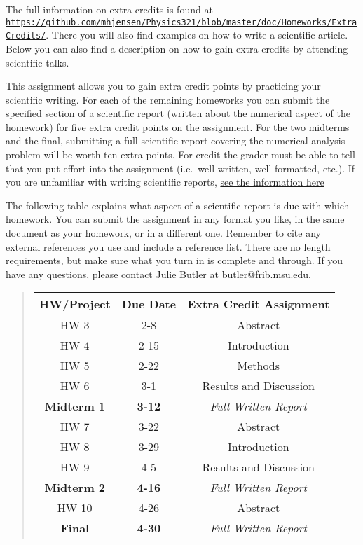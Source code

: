 \documentclass[%
oneside,                 %
final,                   %
10pt]{article}
\begin{document}
The full information on extra credits is found at \href{{https://github.com/mhjensen/Physics321/blob/master/doc/Homeworks/ExtraCredits/}}{\nolinkurl{https://github.com/mhjensen/Physics321/blob/master/doc/Homeworks/ExtraCredits/}}. There you will also find examples on how to write a scientific article. 
Below you can also find a description on how to gain extra credits by attending scientific talks.

This assignment allows you to gain extra credit points by practicing
your scientific writing.  For each of the remaining homeworks you can
submit the specified section of a scientific report (written about the
numerical aspect of the homework) for five extra credit points on the
assignment.  For the two midterms and the final, submitting a full
scientific report covering the numerical analysis problem will be
worth ten extra points.  For credit the grader must be able to tell
that you put effort into the assignment (i.e.~well written, well
formatted, etc.).  If you are unfamiliar with writing scientific
reports, \href{{https://github.com/mhjensen/Physics321/blob/master/doc/Homeworks/ExtraCredits/IntroductionScientificWriting.md}}{see the information here}

The following table explains what aspect of a scientific report is due
with which homework.  You can submit the assignment in any format you
like, in the same document as your homework, or in a different one.
Remember to cite any external references you use and include a
reference list.  There are no length requirements, but make sure what
you turn in is complete and through.  If you have any questions,
please contact Julie Butler at butler@frib.msu.edu.


\begin{quote}
\begin{tabular}{ccc}
\hline
\multicolumn{1}{c}{ HW/Project } & \multicolumn{1}{c}{ Due Date } & \multicolumn{1}{c}{ Extra Credit Assignment } \\
\hline
HW 3               & 2-8           & Abstract                   \\
HW 4               & 2-15          & Introduction               \\
HW 5               & 2-22          & Methods                    \\
HW 6               & 3-1           & Results and Discussion     \\
\textbf{Midterm 1} & \textbf{3-12} & \emph{Full Written Report} \\
HW 7               & 3-22          & Abstract                   \\
HW 8               & 3-29          & Introduction               \\
HW 9               & 4-5           & Results and Discussion     \\
\textbf{Midterm 2} & \textbf{4-16} & \emph{Full Written Report} \\
HW 10              & 4-26          & Abstract                   \\
\textbf{Final}     & \textbf{4-30} & \emph{Full Written Report} \\
\hline
\end{tabular}
\end{quote}
\end{document}
